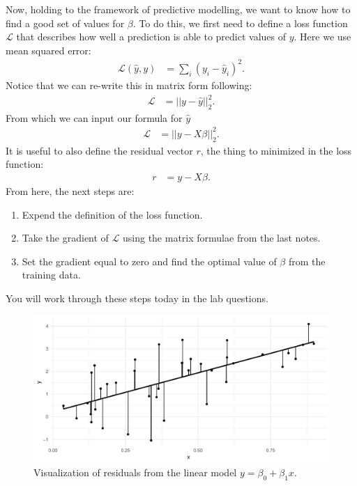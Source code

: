 \documentclass[12pt,hidelinks]{article}
\numberwithin{equation}{section}
\begin{document}
Now, holding to the framework of predictive modelling, we want to know how to
find a good set of values for $\beta$. To do this, we first need to define a loss
function $\mathcal{L}$ that describes how well a prediction is able to predict
values of $y$. Here we use mean squared error:
\begin{align}
\mathcal{L}(\widehat{y}, y) &= \sum_i (y_i - \widehat{y}_i)^2.
\end{align}
Notice that we can re-write this in matrix form following:
\begin{align}
\mathcal{L} &= || y - \widehat{y} ||_2^2.
\end{align}
From which we can input our formula for $\widehat{y}$
\begin{align}
\mathcal{L} &= || y - X \beta ||_2^2. \label{lloss}
\end{align}
It is useful to also define the residual vector $r$, the thing to minimized
in the loss function:
\begin{align}
r &= y - X\beta.
\end{align}
From here, the next steps are:
\begin{enumerate}
\item Expend the definition of the loss function.
\item Take the gradient of $\mathcal{L}$ using the matrix formulae from the last notes.
\item Set the gradient equal to zero and find the optimal value of $\beta$ from
the training data.
\end{enumerate}
You will work through these steps today in the lab questions.

\begin{figure}
\includegraphics[width=\textwidth]{figures/lm_residuals.pdf}
\caption[Residuals from a simple linear model]{Visualization of residuals
from the linear model $y = \beta_0 + \beta_1 x$.}
\label{lm_residuals}
\end{figure}
\end{document}
